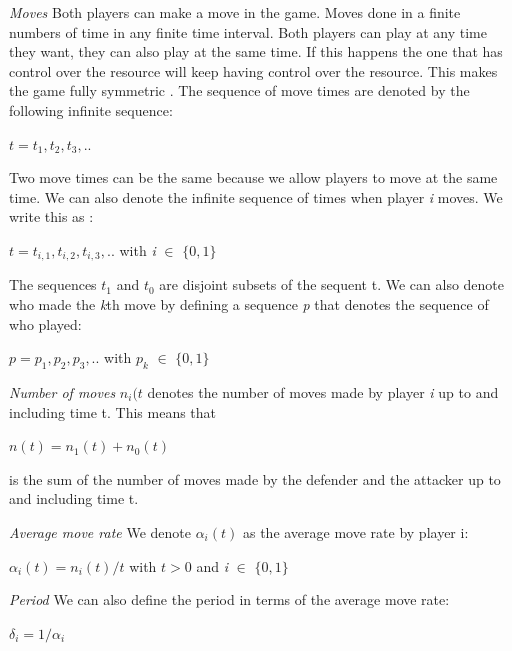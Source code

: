 \begin{description}
\item \textit{Moves} Both players can make a move in the game. Moves done in a finite numbers of time in any finite time interval. Both players can play at any time they want, they can also play at the same time. If this happens the one that has control over the resource will keep having control over the resource.
This makes the game fully symmetric . The sequence of move times are denoted by the following infinite sequence:
\begin{center}
$t=t_{1},t_{2},t_{3},..$
\end{center}
Two move times can be the same because we allow players to move at the same time.
We can also denote the infinite sequence of times when player \textit{i}  moves. We write this as :
\begin{center}
$t=t_{i,1},t_{i,2},t_{i,3},..$ with \textit{i} $ \in $ $\lbrace 0,1 \rbrace$
\end{center}
The sequences $t_{1}$ and $t_{0}$ are disjoint subsets of the sequent t. 
We can also denote who made the \textit{k}th move by defining a sequence \textit{p} that denotes the sequence of who played:
\begin{center}
$p=p_{1},p_{2},p_{3}, .. $ with $p_{k}$ $\in$ $\lbrace 0,1 \rbrace$
\end{center}

\item \textit{Number of moves}  $n_{i}(t$ denotes the number of moves made by player \textit{i} up to and including time t. This means that 
\begin{center}
$n(t)=n_{1}(t) + n_{0}(t)$
\end{center}
is the sum of the number of moves made by the defender and the attacker up to and including time t. 

\item \textit{Average move rate} We denote $\alpha_{i}(t)$ as the average move rate by player i:
\begin{center}
$\alpha_{i}(t) = n_{i}(t)/t$ with $t > 0$ and \textit{i} $ \in $ $\lbrace 0,1 \rbrace$
\end{center}

\item \textit{Period} We can also define the period in terms of the average move rate:
\begin{center}
$\delta_{i}=1/\alpha_{i}$
\end{center}


\end{description}
